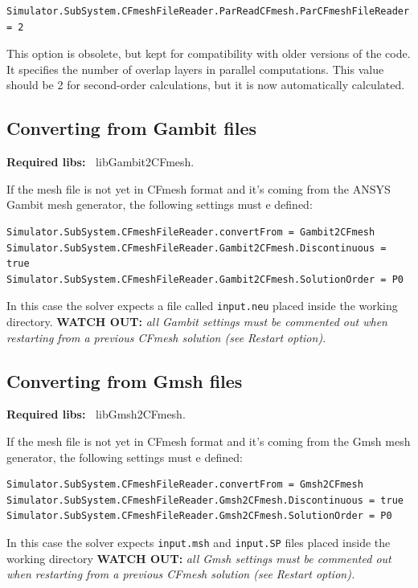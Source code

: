 \documentclass[11pt]{article}
\begin{document}
\begin{lstlisting}[breaklines]
Simulator.SubSystem.CFmeshFileReader.ParReadCFmesh.ParCFmeshFileReader.NbOverlapLayers = 2
\end{lstlisting}
This option is obsolete, but kept for compatibility with older versions of the code. It specifies the number 
of overlap layers in parallel computations. This value should be 2 for second-order calculations, 
but it is now automatically calculated.

\subsection{Converting from Gambit files}

{\bf Required libs:~} libGambit2CFmesh.

If the mesh file is not yet in CFmesh format and it's coming from the ANSYS Gambit mesh generator,
the following settings must e defined:  

\begin{lstlisting}[breaklines]
Simulator.SubSystem.CFmeshFileReader.convertFrom = Gambit2CFmesh
Simulator.SubSystem.CFmeshFileReader.Gambit2CFmesh.Discontinuous = true
Simulator.SubSystem.CFmeshFileReader.Gambit2CFmesh.SolutionOrder = P0
\end{lstlisting}
In this case the solver expects a file called {\tt input.neu} placed inside the working directory.
{\bf WATCH OUT:} {\it all Gambit settings must be commented out when restarting from a previous CFmesh solution 
  (see Restart option).}

\subsection{Converting from Gmsh files}

{\bf Required libs:~} libGmsh2CFmesh.

If the mesh file is not yet in CFmesh format and it's coming from the Gmsh mesh generator,
the following settings must e defined:  

\begin{lstlisting}[breaklines]
Simulator.SubSystem.CFmeshFileReader.convertFrom = Gmsh2CFmesh
Simulator.SubSystem.CFmeshFileReader.Gmsh2CFmesh.Discontinuous = true
Simulator.SubSystem.CFmeshFileReader.Gmsh2CFmesh.SolutionOrder = P0
\end{lstlisting}
In this case the solver expects {\tt input.msh} and {\tt input.SP} files placed inside the working directory
{\bf WATCH OUT:} {\it all Gmsh settings must be commented out when restarting from a previous CFmesh solution 
  (see Restart option).}
\end{document}
